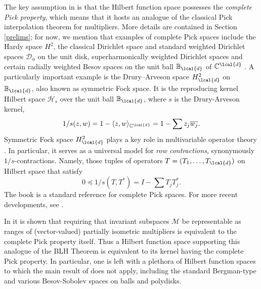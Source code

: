 \documentclass[a4paper,reqno,index]{amsart}
\newcommand{\df}[1]{{\textit{#1}}{\index{#1}}}
\numberwithin{equation}{section}
\newcommand{\CC}{\mathbb{C}}
\newcommand{\cH}{\mathcal{H}}
\newcommand{\ol}[1]{\overline{#1}}
\theoremstyle{definition}
\begin{document}
 The key assumption in \cite{mcctrent} is that the Hilbert function space possesses the \textit{complete Pick property},  which means that it hosts an analogue of the classical Pick interpolation theorem for multipliers. More details are contained in Section \ref{prelims}; for now, we mention that examples of complete Pick spaces include the Hardy space $H^2$, the classical Dirichlet space and standard
weighted Dirichlet spaces $\mathcal{D}_{\alpha} $ on the unit disk, superharmonically weighted Dirichlet spaces \cite{ShimorinDirichletCP} and certain radially weighted Besov spaces on the unit ball $\mathbb{B}_{\lcal{d}}$ of $\mathbb{C}^\lcal{d}$ \cite{BesovPick}. A particularly important example is the Drury–Arveson space $H^2_{\lcal{d}}$ on   $\mathbb{B}_{\lcal{d}}$, also known as symmetric Fock space.  
It is the reproducing kernel Hilbert space $\cH_s$ over
the unit ball $\mathbb{B}_{\lcal{d}}$, where $s$ is the
Drury-Arveson kernel,
\[
 1/s(z,w) = 1-\langle z,w\rangle_{\CC^{\lcal{d}}} = 1-\sum z_j\ol{w_j}.
\]
Symmetric Fock space $H^2_{\lcal{d}}$ plays a key role in
multivariable operator theory  \cite{ArvesonIII}. In particular, it serves as a universal model for \df{row contractions}, synonymously
$1/s$-contractions.  Namely, those 
tuples  of operators $T=(T_1,\dots,T_{\lcal{d}})$ on Hilbert space
that satisfy 
\[
 0\preceq 1/s(T,T^*) = I- \sum T_j T_j^*. 
\]
The book \cite{Pickbook} is a standard reference for complete Pick spaces. For more recent developments, see \cite{Hartzsurvey, shalit2014operator}.   



\par 

In  \cite[Theorem 0.7]{mcctrent} it is shown that   requiring that invariant subspaces $\mathcal{M}$ be representable as ranges
of (vector-valued) partially isometric multipliers is equivalent to the complete Pick
property itself.  Thus a Hilbert function space supporting this analogue of the BLH Theorem is equivalent to its kernel having the complete Pick property. 
In particular, one is left with a plethora of Hilbert function spaces to which the main result of \cite{mcctrent} does not apply, including the standard Bergman-type and various Besov-Sobolev spaces on balls and polydisks. \par 
\end{document}
